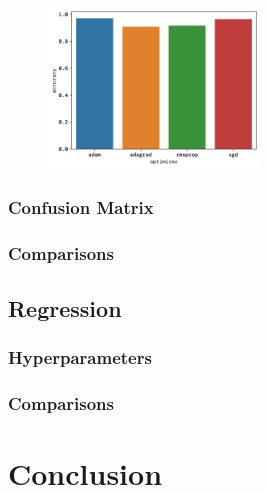 \documentclass[twoside,11pt]{report}
\begin{document}
\begin{figure}[h]
    \begin{center}
        \includegraphics[width=0.5\textwidth]{../runsAndFigures/optimizer_accuracy.png}
    \end{center}
    \caption{}\label{fig:}
\end{figure}





\subsubsection{Confusion Matrix}
\label{sec:confusionmatrix}


\subsubsection{Comparisons}
\label{sec:comparisons}

\subsection{Regression}
\label{sec:regression}


\subsubsection{Hyperparameters}
\label{sec:hyperparameters2}



\subsubsection{Comparisons}
\label{sec:comparisons2}





\section{Conclusion}
\label{sec:conclusion}
\end{document}
